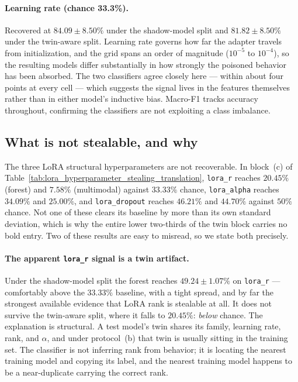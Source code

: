 \documentclass[11pt]{article}
\newcommand{\hd}[1]{\texttt{#1}}
\begin{document}
\paragraph{Learning rate (chance 33.3\%).} Recovered at $84.09 \pm 8.50\%$ under the
shadow-model split and $81.82 \pm 8.50\%$ under the twin-aware split. Learning rate
governs how far the adapter travels from initialization, and the grid spans an order of
magnitude ($10^{-5}$ to $10^{-4}$), so the resulting models differ substantially in how
strongly the poisoned behavior has been absorbed. The two classifiers agree closely here
--- within about four points at every cell --- which suggests the signal lives in the
features themselves rather than in either model's inductive bias. Macro-F1 tracks accuracy
throughout, confirming the classifiers are not exploiting a class imbalance.

\subsection{What is not stealable, and why}
\label{sec:twin}

The three LoRA structural hyperparameters are not recoverable. In block~(c) of
Table~\ref{tab:lora_hyperparameter_stealing_translation}, \hd{lora\_r} reaches $20.45\%$
(forest) and $7.58\%$ (multimodal) against $33.33\%$ chance, \hd{lora\_alpha} reaches
$34.09\%$ and $25.00\%$, and \hd{lora\_dropout} reaches $46.21\%$ and $44.70\%$ against
$50\%$ chance. Not one of these clears its baseline by more than its own standard
deviation, which is why the entire lower two-thirds of the twin block carries no bold
entry. Two of these results are easy to misread, so we state both precisely.

\paragraph{The apparent \hd{lora\_r} signal is a twin artifact.} Under the shadow-model
split the forest reaches $49.24 \pm 1.07\%$ on \hd{lora\_r} --- comfortably above the
$33.33\%$ baseline, with a tight spread, and by far the strongest available evidence that
LoRA rank is stealable at all. It does not survive the twin-aware split, where it falls to
$20.45\%$: \emph{below} chance. The explanation is structural. A test model's twin shares
its family, learning rate, rank, and $\alpha$, and under protocol~(b) that twin is usually
sitting in the training set. The classifier is not inferring rank from behavior; it is
locating the nearest training model and copying its label, and the nearest training model
happens to be a near-duplicate carrying the correct rank.
\end{document}
